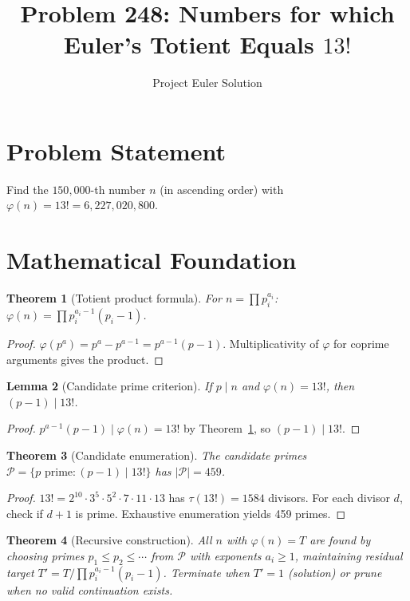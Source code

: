 \documentclass[12pt]{article}
\title{Problem 248: Numbers for which Euler's Totient Equals $13!$}
\author{Project Euler Solution}
\date{}
\newtheorem{theorem}{Theorem}
\newtheorem{lemma}[theorem]{Lemma}
\begin{document}
\maketitle

\section{Problem Statement}

Find the $150{,}000$-th number $n$ (in ascending order) with $\varphi(n)=13!=6{,}227{,}020{,}800$.

\section{Mathematical Foundation}

\begin{theorem}[Totient product formula]\label{thm:totient}
For $n=\prod p_i^{a_i}$: $\varphi(n)=\prod p_i^{a_i-1}(p_i-1)$.
\end{theorem}

\begin{proof}
$\varphi(p^a)=p^a-p^{a-1}=p^{a-1}(p-1)$. Multiplicativity of $\varphi$ for coprime arguments gives the product.
\end{proof}

\begin{lemma}[Candidate prime criterion]\label{lem:cand}
If $p\mid n$ and $\varphi(n)=13!$, then $(p-1)\mid 13!$.
\end{lemma}

\begin{proof}
$p^{a-1}(p-1)\mid\varphi(n)=13!$ by Theorem~\ref{thm:totient}, so $(p-1)\mid 13!$.
\end{proof}

\begin{theorem}[Candidate enumeration]\label{thm:enum}
The candidate primes $\mathcal{P}=\{p\text{ prime}:(p-1)\mid 13!\}$ has $|\mathcal{P}|=459$.
\end{theorem}

\begin{proof}
$13!=2^{10}\cdot 3^5\cdot 5^2\cdot 7\cdot 11\cdot 13$ has $\tau(13!)=1584$ divisors. For each divisor $d$, check if $d+1$ is prime. Exhaustive enumeration yields 459 primes.
\end{proof}

\begin{theorem}[Recursive construction]\label{thm:recurse}
All $n$ with $\varphi(n)=T$ are found by choosing primes $p_1\le p_2\le\cdots$ from $\mathcal{P}$ with exponents $a_i\ge 1$, maintaining residual target $T'=T/\prod p_i^{a_i-1}(p_i-1)$. Terminate when $T'=1$ (solution) or prune when no valid continuation exists.
\end{theorem}
\end{document}
